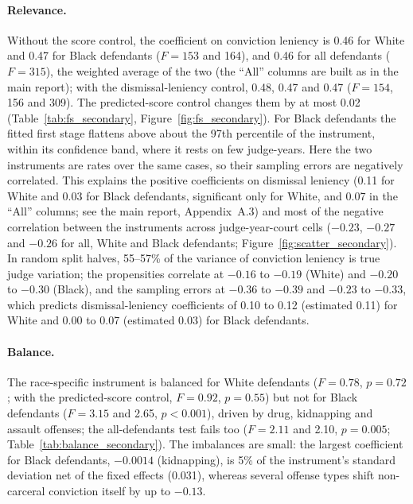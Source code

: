 \documentclass[11pt]{article}
\begin{document}
\paragraph{Relevance.} Without the score control, the coefficient on conviction leniency is 0.46 for White and 0.47 for Black defendants ($F = 153$ and 164), and 0.46 for all defendants ($F = 315$), the weighted average of the two (the ``All'' columns are built as in the main report); with the dismissal-leniency control, 0.48, 0.47 and 0.47 ($F = 154$, 156 and 309). The predicted-score control changes them by at most 0.02 (Table~\ref{tab:fs_secondary}, Figure~\ref{fig:fs_secondary}). For Black defendants the fitted first stage flattens above about the 97th percentile of the instrument, within its confidence band, where it rests on few judge-years. Here the two instruments are rates over the same cases, so their sampling errors are negatively correlated. This explains the positive coefficients on dismissal leniency (0.11 for White and 0.03 for Black defendants, significant only for White, and 0.07 in the ``All'' columns; see the main report, Appendix~A.3) and most of the negative correlation between the instruments across judge-year-court cells ($-0.23$, $-0.27$ and $-0.26$ for all, White and Black defendants; Figure~\ref{fig:scatter_secondary}). In random split halves, 55--57\% of the variance of conviction leniency is true judge variation; the propensities correlate at $-0.16$ to $-0.19$ (White) and $-0.20$ to $-0.30$ (Black), and the sampling errors at $-0.36$ to $-0.39$ and $-0.23$ to $-0.33$, which predicts dismissal-leniency coefficients of 0.10 to 0.12 (estimated 0.11) for White and 0.00 to 0.07 (estimated 0.03) for Black defendants.

\paragraph{Balance.} The race-specific instrument is balanced for White defendants ($F = 0.78$, $p = 0.72$; with the predicted-score control, $F = 0.92$, $p = 0.55$) but not for Black defendants ($F = 3.15$ and 2.65, $p < 0.001$), driven by drug, kidnapping and assault offenses; the all-defendants test fails too ($F = 2.11$ and 2.10, $p = 0.005$; Table~\ref{tab:balance_secondary}). The imbalances are small: the largest coefficient for Black defendants, $-0.0014$ (kidnapping), is 5\% of the instrument's standard deviation net of the fixed effects (0.031), whereas several offense types shift non-carceral conviction itself by up to $-0.13$.
\end{document}
